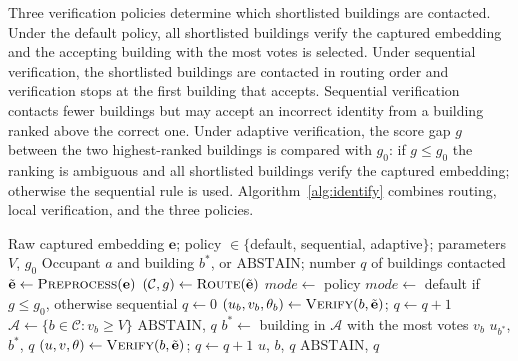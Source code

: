 \documentclass[pdflatex,sn-mathphys-num]{sn-jnl}%
\theoremstyle{thmstyleone}%
\theoremstyle{thmstyletwo}%
\theoremstyle{thmstylethree}%
\begin{document}
Three verification policies determine which shortlisted buildings are contacted. Under the default policy, all shortlisted buildings verify the captured embedding and the accepting building with the most votes is selected. Under sequential verification, the shortlisted buildings are contacted in routing order and verification stops at the first building that accepts. Sequential verification contacts fewer buildings but may accept an incorrect identity from a building ranked above the correct one. Under adaptive verification, the score gap $g$ between the two highest-ranked buildings is compared with $g_0$: if $g\le g_0$ the ranking is ambiguous and all shortlisted buildings verify the captured embedding; otherwise the sequential rule is used. Algorithm~\ref{alg:identify} combines routing, local verification, and the three policies.

\begin{algorithm}[!t]
\footnotesize
\caption{Identification with a verification policy}
\label{alg:identify}
\begin{algorithmic}[1]
\Require Raw captured embedding $\mathbf{e}$; policy $\in\{$default, sequential, adaptive$\}$; parameters $V$, $g_0$
\Ensure Occupant $a$ and building $b^*$, or $\mathrm{ABSTAIN}$; number $q$ of buildings contacted
\State $\tilde{\mathbf{e}}\gets\textsc{Preprocess}(\mathbf{e})$ 
\State $(\mathcal{C},g)\gets\textsc{Route}(\tilde{\mathbf{e}})$ 
\State $\mathit{mode}\gets$ policy
  \State $\mathit{mode}\gets$ default if $g\leq g_0$, otherwise sequential 
\EndIf
\State $q\gets0$
 
    \State $(u_b,v_b,\theta_b)\gets\textsc{Verify}(b,\tilde{\mathbf{e}})$; $q\gets q+1$ 
  \EndFor
  \State $\mathcal{A}\gets\{b\in\mathcal{C}:v_b\geq V\}$ 
    \State \Return $\mathrm{ABSTAIN}$, $q$
  \EndIf
  \State $b^*\gets$ building in $\mathcal{A}$ with the most votes $v_b$ 
  \State \Return $u_{b^*}$, $b^*$, $q$
\Else {}
    \State $(u,v,\theta)\gets\textsc{Verify}(b,\tilde{\mathbf{e}})$; $q\gets q+1$
      \State \Return $u$, $b$, $q$
    \EndIf
  \EndFor
  \State \Return $\mathrm{ABSTAIN}$, $q$
\EndIf
\end{algorithmic}
\end{algorithm}
\end{document}
